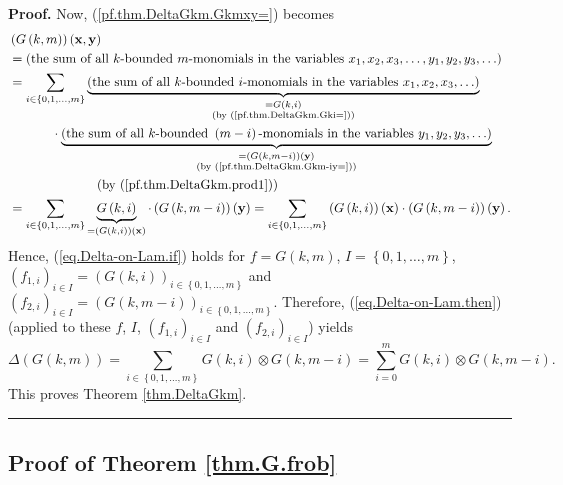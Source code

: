 \documentclass[numbers=enddot,12pt,final,onecolumn,notitlepage]{scrartcl}%
\theoremstyle{definition}
\newenvironment{proof}[1][Proof]{\noindent\textbf{#1.} }{\ \rule{0.5em}{0.5em}}
\let\sumnonlimits\sum
\renewcommand{\sum}{\sumnonlimits\limits}
\begin{document}
\begin{proof}
Now, (\ref{pf.thm.DeltaGkm.Gkmxy=}) becomes%
\begin{align*}
&  \left(  G\left(  k,m\right)  \right)  \left(  \mathbf{x},\mathbf{y}\right)
\\
&  =\left(  \text{the sum of all }k\text{-bounded }m\text{-monomials in the
variables }x_{1},x_{2},x_{3},\ldots,y_{1},y_{2},y_{3},\ldots\right) \\
&  =\sum_{i\in\left\{  0,1,\ldots,m\right\}  }\underbrace{\left(  \text{the
sum of all }k\text{-bounded }i\text{-monomials in the variables }x_{1}%
,x_{2},x_{3},\ldots\right)  }_{\substack{=G\left(  k,i\right)  \\\text{(by
(\ref{pf.thm.DeltaGkm.Gki=}))}}}\\
&  \ \ \ \ \ \ \ \ \ \ \cdot\underbrace{\left(  \text{the sum of all
}k\text{-bounded }\left(  m-i\right)  \text{-monomials in the variables }%
y_{1},y_{2},y_{3},\ldots\right)  }_{\substack{=\left(  G\left(  k,m-i\right)
\right)  \left(  \mathbf{y}\right)  \\\text{(by (\ref{pf.thm.DeltaGkm.Gkm-iy=}%
))}}}\\
&  \ \ \ \ \ \ \ \ \ \ \ \ \ \ \ \ \ \ \ \ \left(  \text{by
(\ref{pf.thm.DeltaGkm.prod1})}\right) \\
&  =\sum_{i\in\left\{  0,1,\ldots,m\right\}  }\underbrace{G\left(  k,i\right)
}_{=\left(  G\left(  k,i\right)  \right)  \left(  \mathbf{x}\right)  }%
\cdot\left(  G\left(  k,m-i\right)  \right)  \left(  \mathbf{y}\right)
=\sum_{i\in\left\{  0,1,\ldots,m\right\}  }\left(  G\left(  k,i\right)
\right)  \left(  \mathbf{x}\right)  \cdot\left(  G\left(  k,m-i\right)
\right)  \left(  \mathbf{y}\right)  .
\end{align*}
Hence, (\ref{eq.Delta-on-Lam.if}) holds for $f=G\left(  k,m\right)  $,
$I=\left\{  0,1,\ldots,m\right\}  $, $\left(  f_{1,i}\right)  _{i\in
I}=\left(  G\left(  k,i\right)  \right)  _{i\in\left\{  0,1,\ldots,m\right\}
}$ and $\left(  f_{2,i}\right)  _{i\in I}=\left(  G\left(  k,m-i\right)
\right)  _{i\in\left\{  0,1,\ldots,m\right\}  }$. Therefore,
(\ref{eq.Delta-on-Lam.then}) (applied to these $f$, $I$, $\left(
f_{1,i}\right)  _{i\in I}$ and $\left(  f_{2,i}\right)  _{i\in I}$) yields%
\[
\Delta\left(  G\left(  k,m\right)  \right)  =\sum_{i\in\left\{  0,1,\ldots
,m\right\}  }G\left(  k,i\right)  \otimes G\left(  k,m-i\right)  =\sum
_{i=0}^{m}G\left(  k,i\right)  \otimes G\left(  k,m-i\right)  .
\]
This proves Theorem \ref{thm.DeltaGkm}.
\end{proof}

\subsection{\label{subsect.proofs.G.frob}Proof of Theorem \ref{thm.G.frob}}
\end{document}
